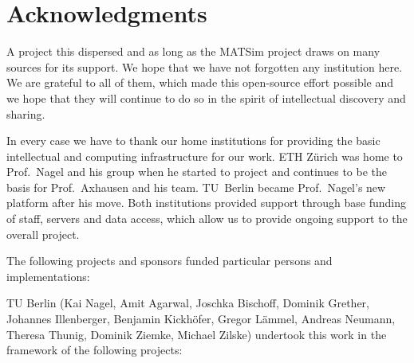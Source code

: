 \chapter*{Acknowledgments}
A project this dispersed and as long as the MATSim project draws on many sources for its support. We hope that we have not forgotten any institution here. 
We are grateful to all of them, which made this open-source effort possible and we hope that they will continue to do so in the spirit of intellectual discovery and sharing. 

In every case we have to thank our home institutions for providing the basic intellectual and computing infrastructure for our work. 
ETH Zürich was home to Prof.~Nagel and his group when he started to project and continues to be the basis for Prof.~Axhausen and his team. 
TU~Berlin became Prof.~Nagel's new platform after his move. 
Both institutions provided support through base funding of staff, servers and data access, which allow us to provide ongoing support to the overall project. 

The following projects and sponsors funded particular persons and implementations: 

TU Berlin (Kai Nagel, Amit Agarwal, Joschka Bischoff, Dominik Grether, Johannes Illenberger, Benjamin Kickhöfer, Gregor Lämmel, Andreas Neumann, Theresa Thunig, Dominik Ziemke, Michael Zilske) undertook this work in the framework of the following projects: 

